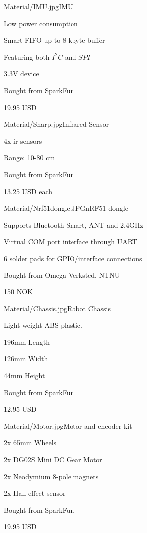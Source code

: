 \begin{material}{Material/IMU.jpg}{IMU \cite{sparkfun} }
\item Low power consumption
\item Smart FIFO up to 8 kbyte buffer
\item Featuring both $I^2C$ and $SPI$
\item 3.3V device
\item Bought from SparkFun
\item 19.95 USD
\end{material}
\newpage
{}
\begin{material}{Material/Sharp.jpg}{Infrared Sensor \cite{sparkfun} }
\item 4x \acrfull{ir} sensors
\item Range: 10-80 cm
\item Bought from SparkFun
\item 13.25 USD each
\end{material}

\begin{material}{Material/Nrf51dongle.JPG}{nRF51-dongle \cite{nrf51Dongle} }
\item Supports Bluetooth Smart, ANT and 2.4GHz
\item Virtual COM port interface through UART
\item 6 solder pads for GPIO/interface connections
\item Bought from Omega Verksted, NTNU
\item 150 NOK
\end{material}

\begin{material}{Material/Chassis.jpg}{Robot Chassis \cite{sparkfun} }
\item Light weight ABS plastic.
\item 196mm Length 
\item 126mm Width 
\item 44mm Height
\item Bought from SparkFun
\item 12.95 USD
\end{material}

\newpage
{}
\begin{material}{Material/Motor.jpg}{Motor and encoder kit \cite{sparkfun} }
\item 2x 65mm Wheels
\item 2x DG02S Mini DC Gear Motor
\item 2x Neodymium 8-pole magnets
\item 2x Hall effect sensor
\item Bought from SparkFun
\item 19.95 USD
\end{material}

